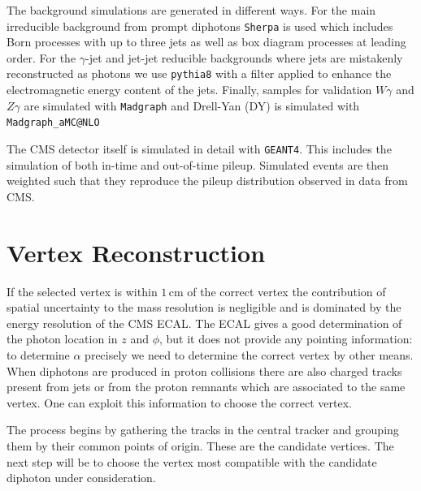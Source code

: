 The background simulations are generated in different ways. For the main irreducible background from prompt diphotons \texttt{Sherpa} is used which includes Born processes with up to three jets as well as box diagram processes at leading order. 
For the $\gamma$-jet and jet-jet reducible backgrounds where jets are mistakenly reconstructed as photons we use \texttt{pythia8} with a filter applied to enhance the electromagnetic energy content of the jets. 
Finally, samples for validation $W\gamma$ and $Z\gamma$ are simulated with \texttt{Madgraph} and Drell-Yan (DY) is simulated with \texttt{Madgraph_{}aMC@NLO}


The CMS detector itself is simulated in detail with \texttt{GEANT4}. 
This includes the simulation of both in-time and out-of-time pileup. 
Simulated events are then weighted such that they reproduce the pileup distribution observed in data from CMS.






\section{Vertex Reconstruction}
If the selected vertex is within $1$\,cm of the correct vertex the contribution of spatial uncertainty to the mass resolution is negligible and is dominated by the energy resolution of the CMS ECAL. 
The ECAL gives a good determination of the photon location in $z$ and $\phi$, but it does not provide any pointing information: to determine $\alpha$ precisely we need to determine the correct vertex by other means.
When diphotons are produced in proton collisions there are also charged tracks present from jets or from the proton remnants which are associated to the same vertex. One can exploit this information to choose the correct vertex.  


The process begins by gathering the tracks in the central tracker and grouping them by their common points of origin. These are the candidate vertices. The next step will be to choose the vertex most compatible with the candidate diphoton under consideration.

